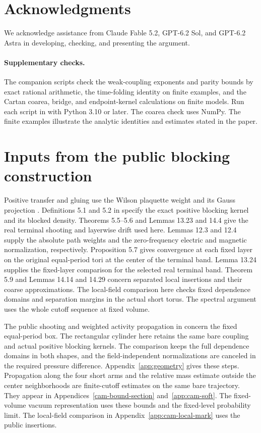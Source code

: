 \documentclass[11pt,a4paper]{article}
\numberwithin{equation}{section}
\begin{document}
\section*{Acknowledgments}
We acknowledge assistance from Claude Fable 5.2, GPT-6.2 Sol, and GPT-6.2 Astra in developing, checking, and presenting the argument.

\paragraph{Supplementary checks.}
The companion scripts check the weak-coupling exponents and parity bounds by exact rational arithmetic, the time-folding identity on finite examples, and the Cartan coarea, bridge, and endpoint-kernel calculations on finite models. Run each script in  with Python 3.10 or later. The coarea check uses NumPy. The finite examples illustrate the analytic identities and estimates stated in the paper.

\appendix
\section{Inputs from the public blocking construction}
\label{app:inputs}

Positive transfer and gluing use the Wilson plaquette weight and its Gauss projection \cite{luscher-transfer,osterwalder-seiler}. Definitions 5.1 and 5.2 in \cite{armstrong} specify the exact positive blocking kernel and its blocked density. Theorems 5.5--5.6 and Lemmas 13.23 and 14.4 give the real terminal shooting and layerwise drift used here. Lemmas 12.3 and 12.4 supply the absolute path weights and the zero-frequency electric and magnetic normalization, respectively. Proposition 5.7 gives convergence at each fixed layer on the original equal-period tori at the center of the terminal band. Lemma 13.24 supplies the fixed-layer comparison for the selected real terminal band. Theorem 5.9 and Lemmas 14.14 and 14.29 concern separated local insertions and their coarse approximations. The local-field comparison here checks fixed dependence domains and separation margins in the actual short torus. The spectral argument uses the whole cutoff sequence at fixed volume.

The public shooting and weighted activity propagation in \cite{armstrong} concern the fixed equal-period box. The rectangular cylinder here retains the same bare coupling and actual positive blocking kernels. The comparison keeps the full dependence domains in both shapes, and the field-independent normalizations are canceled in the required pressure difference. Appendix~\ref{app:geometry} gives these steps. Propagation along the four short arms and the relative mass estimate outside the center neighborhoods are finite-cutoff estimates on the same bare trajectory. They appear in Appendices~\ref{cam-bound-section} and~\ref{app:cam-soft}. The fixed-volume vacuum representation uses these bounds and the fixed-level probability limit. The local-field comparison in Appendix~\ref{app:cam-local-mark} uses the public insertions.
\end{document}
